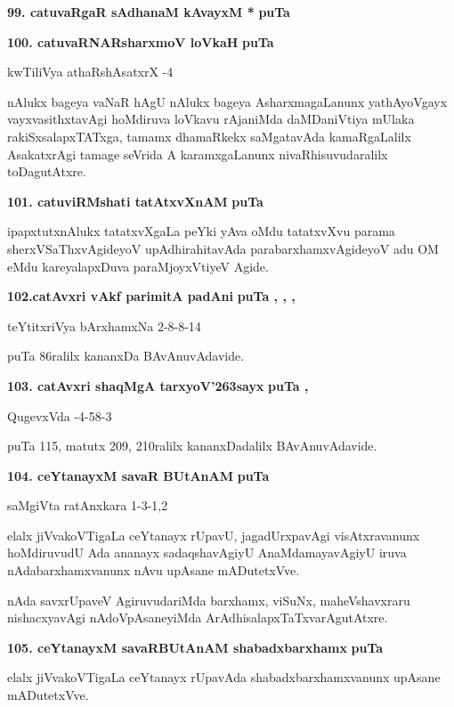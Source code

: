 \medskip
\noindent
\textbf{99. catuvaRgaR sAdhanaM kAvayxM *} \hfill{\bf puTa \pageref{193}}

\medskip
\noindent
\textbf{100. catuvaRNARsharxmoV loVkaH} \hfill{\bf puTa \pageref{90e}}

\hfill{kwTiliVya athaRshAsatxrX -4}

\smallskip
nAlukx bageya vaNaR hAgU nAlukx bageya AsharxmagaLanunx yathAyoVgayx vayxvasithxtavAgi hoMdiruva loVkavu rAjaniMda daMDaniVtiya mUlaka rakiSxsalapxTATxga, tamamx dhamaRkekx saMgatavAda kamaRgaLalilx AsakatxrAgi tamage seVrida A karamxgaLanunx nivaRhisuvudaralilx toDagutAtxre.

\medskip
\noindent
\textbf{101. catuviRMshati tatAtxvXnAM} \hfill{\bf puTa \pageref{150}}

\smallskip
ipapxtutxnAlukx tatatxvXgaLa peYki yAva oMdu tatatxvXvu parama sherxVSaThxvAgideyoV upAdhirahitavAda parabarxhamxvAgideyoV adu OM eMdu kareyalapxDuva paraMjoyxVtiyeV Agide.

\medskip
\noindent
\textbf{102.catAvxri vAkf parimitA padAni} \hfill{\bf puTa \pageref{1}, \pageref{31}, \pageref{86g}, \pageref{152f}}

\hfill{teYtitxriVya bArxhamxNa 2-8-8-14}

\smallskip
puTa 86ralilx kananxDa BAvAnuvAdavide.

\medskip
\noindent
\textbf{103. catAvxri shaqMgA tarxyoV\char'263sayx} \hfill{\bf puTa \pageref{111}, \pageref{208a}}

\hfill{QugevxVda -4-58-3}

\smallskip
puTa 115, matutx 209, 210ralilx kananxDadalilx BAvAnuvAdavide.

\medskip
\noindent
\textbf{104. ceYtanayxM savaR BUtAnAM} \hfill{\bf puTa \pageref{149a}}

\hfill{saMgiVta ratAnxkara 1-3-1,2}

\smallskip
elalx jiVvakoVTigaLa ceYtanayx rUpavU, jagadUrxpavAgi visAtxravanunx hoMdiruvudU Ada ananayx sadaqshavAgiyU AnaMdamayavAgiyU iruva nAdabarxhamxvanunx nAvu upAsane mADutetxVve.

nAda savxrUpaveV AgiruvudariMda barxhamx, viSuNx, maheVshavxraru nishacxyavAgi nAdoVpAsaneyiMda ArAdhisalapxTaTxvarAgutAtxre.

\medskip
\noindent
\textbf{105. ceYtanayxM savaRBUtAnAM shabadxbarxhamx} \hfill{\bf puTa \pageref{203}}

\smallskip
elalx jiVvakoVTigaLa ceYtanayx rUpavAda shabadxbarxhamxvanunx upAsane mADutetxVve.

